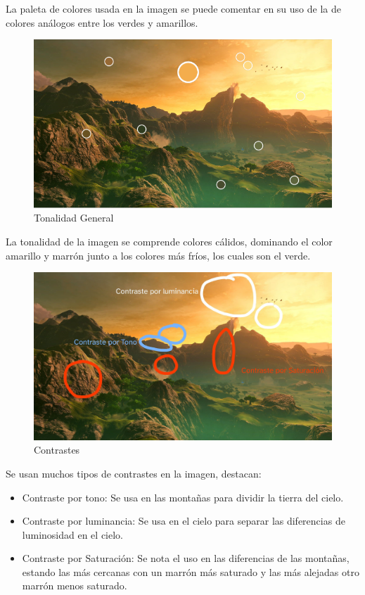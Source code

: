 \documentclass[12pt]{article}
\begin{document}
          La paleta de colores usada en la imagen se puede comentar en su uso de la de colores análogos entre los verdes y amarillos.

          \begin{figure}[H]
            \centering
            \includegraphics[scale = 0.75]{images/Jesus/Seccion16/Tonalidad.png}
            \caption{Tonalidad General}
          \end{figure} 

          La tonalidad de la imagen se comprende colores cálidos, dominando el color amarillo y marrón junto a los colores más fríos, los cuales son el verde.

          \begin{figure}[H]
            \centering
            \includegraphics[scale = 0.2]{Jesus/Seccion16/Contrastes.jpg}
            \caption{Contrastes}
          \end{figure} 

          Se usan muchos tipos de contrastes en la imagen, destacan: 
          \begin{itemize}
            \item Contraste por tono: Se usa en las montañas para dividir la tierra del cielo.
            \item Contraste por luminancia: Se usa en el cielo para separar las diferencias de luminosidad en el cielo. 
            \item Contraste por Saturación: Se nota el uso en las diferencias de las montañas, estando las más cercanas con un marrón más saturado y las más alejadas otro marrón menos saturado.
          \end{itemize}
          
\end{document}
